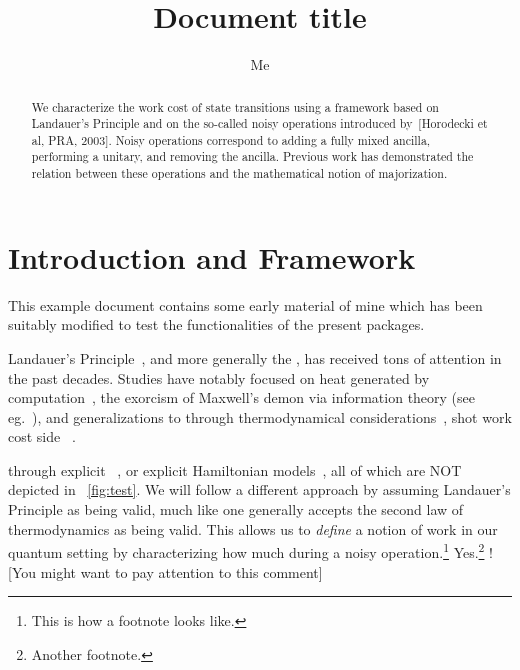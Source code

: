 \documentclass[10pt,a4paper,aps,reprint,notitlepage,nofootinbib]{revtex4-1}
\begin{document}
\title{Document title}
\author{Me}
\begin{abstract}
  We characterize the work cost of state transitions using a framework based on
  Landauer's Principle and on the so-called noisy operations introduced
  by~[Horodecki et al, PRA, 2003]. Noisy operations correspond to adding a fully
  mixed ancilla, performing a unitary, and removing the ancilla. Previous work
  has demonstrated the relation between these operations and the mathematical
  notion of majorization.
\end{abstract}
\maketitle

\section{Introduction and Framework}

This example document contains some early material of mine which has been
suitably modified to test the functionalities of the present packages.

Landauer's Principle~\cite{Landauer1961_5392446Erasure}, and more generally the
,
 \jd has received tons of attention \endjd in the
past decades.  Studies have notably focused on heat generated by
computation~\cite{Bennett1982IJTP_ThermodynOfComp}, the exorcism of Maxwell's
demon via information theory (see eg.~\cite{Bennett2003_NotesLP}), and
generalizations to  through thermodynamical
considerations~\cite{Oppenheim2002PRL_thermodynamical},  shot work cost    side
~\cite{delRio2011Nature}.

 through explicit ~\cite{Szilard1929ZeitschriftFuerPhysik,Dahlsten2011NJP_inadequacy}, or
explicit Hamiltonian models~\cite{Alicki2004_hamiltonian}, all of which are NOT
depicted in \figurename~\ref{fig:test}. We will follow a different approach by
assuming Landauer's Principle as being valid, much like one generally accepts
the second law of thermodynamics as being valid. This allows us to {\em define}
a notion of work in our quantum setting by characterizing how much
 during a noisy
operation.\footnote{This is how a footnote looks like.} Yes.\footnote{Another
  footnote.} \ccsix![You might want to pay attention to this comment]
\end{document}
